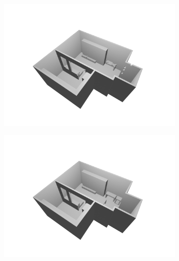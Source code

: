 \documentclass[binding=0.6cm,noexaminfo]{sapthesis}
\begin{document}
\begin{figure}[h!]
\centering
\begin{subfigure}{.49\textwidth}
	\centering
	\includegraphics[width=.90\linewidth]{results/pred_0}
	\caption{}
\end{subfigure}
\begin{subfigure}{.49\textwidth}
	\centering
	\includegraphics[width=.90\linewidth]{results/true_0}
	\caption{}
\end{subfigure}


\end{figure}
\end{document}

